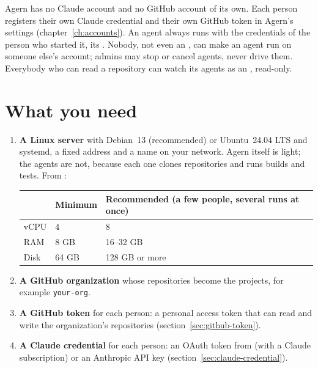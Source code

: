 Agern has no Claude account and no GitHub account of its own. Each person registers their own
Claude credential and their own GitHub token in Agern's settings (chapter~\ref{ch:accounts}). An
agent always runs with the credentials of the person who started it, its . Nobody,
not even an , can make an agent run on someone else's account; admins may stop or
cancel agents, never drive them. Everybody who can read a repository can watch its agents as an
, read-only.

\section{What you need}\label{sec:needs}

\begin{enumerate}
  \item \textbf{A Linux server} with Debian~13 (recommended) or Ubuntu~24.04 LTS and systemd, a
    fixed address and a name on your network. Agern itself is light; the agents are not, because
    each one clones repositories and runs builds and tests. From
    :

    \begin{center}
    \begin{tabular}{@{}lll@{}}
      \toprule
      & Minimum & Recommended (a few people, several runs at once)\\
      \midrule
      vCPU & 4 & 8\\
      RAM & 8 GB & 16--32 GB\\
      Disk & 64 GB & 128 GB or more\\
      \bottomrule
    \end{tabular}
    \end{center}
  \item \textbf{A GitHub organization} whose repositories become the projects, for example
    \texttt{your-org}.
  \item \textbf{A GitHub token} for each person: a personal access token that can read and write
    the organization's repositories (section~\ref{sec:github-token}).
  \item \textbf{A Claude credential} for each person: an OAuth token from 
    (with a Claude subscription) or an Anthropic API key (section~\ref{sec:claude-credential}).
\end{enumerate}

